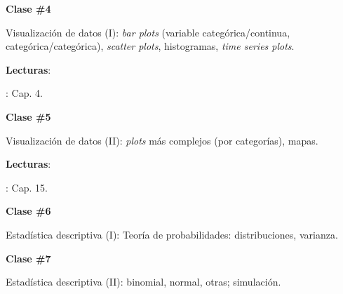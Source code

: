 \documentclass[letterpaper]{article}
\renewenvironment{itemize}{
  \begin{list}{}{
    \setlength{\leftmargin}{1.5em}
  }
}{
  \end{list}
}
\begin{document}
\begin{enumerate}
			\begin{itemize} 
				\item[$\bullet$] {\bf Clase \#4}
					\begin{itemize} 
						\item[$\circ$] Visualizaci\'on de datos (I): \emph{bar plots} (variable categ\'orica/continua, categ\'orica/categ\'orica), \emph{scatter plots}, histogramas, \emph{time series plots}. %
						\item[$\circ$] {\bf Lecturas}:
							\begin{itemize}
								\item[$\diamond$] \textcite{Urdinez:2019aa}: Cap. 4.
							\end{itemize}
					\end{itemize}
			\end{itemize}



			\begin{itemize} 
				\item[$\bullet$] {\bf Clase \#5}
					\begin{itemize} 
				\item[$\circ$] Visualizaci\'on de datos (II): \emph{plots} m\'as complejos (por categor\'ias), mapas.
				\item[$\circ$] {\bf Lecturas}: 
					\begin{itemize}
						\item[$\diamond$] \textcite{Urdinez:2019aa}: Cap. 15.
					\end{itemize}
					\end{itemize}
			\end{itemize}


	\item {}

			\begin{itemize} 
				\item[$\bullet$] {\bf Clase \#6}
					\begin{itemize} 
				\item[$\circ$] Estad\'istica descriptiva (I): Teor\'ia de probabilidades: distribuciones, varianza. %
					\end{itemize}
			\end{itemize}


			\begin{itemize} 
				\item[$\bullet$] {\bf Clase \#7}
					\begin{itemize} 
				\item[$\circ$] Estad\'istica descriptiva (II): binomial, normal, otras; simulaci\'on. %
					\end{itemize}
			\end{itemize}



\end{enumerate}
\end{document}
